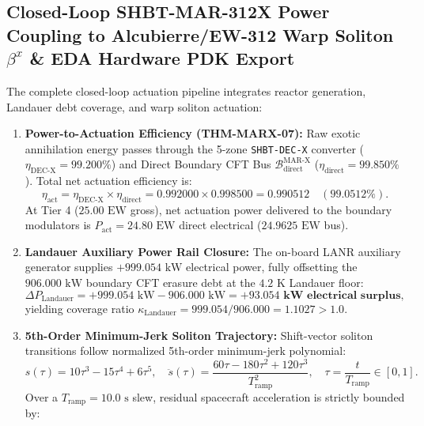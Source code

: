 \documentclass[11pt,onecolumn]{article}
\begin{document}
\subsection{Closed-Loop SHBT-MAR-312X Power Coupling to Alcubierre/EW-312 Warp Soliton \texorpdfstring{$\beta^x$}{beta\textasciicircum x} \& EDA Hardware PDK Export}
\label{subsec:warp_soliton_coupling}
The complete closed-loop actuation pipeline integrates reactor generation, Landauer debt coverage, and warp soliton actuation:
\begin{enumerate}
    \item \textbf{Power-to-Actuation Efficiency (THM-MARX-07):} Raw exotic annihilation energy passes through the 5-zone \texttt{SHBT-DEC-X} converter ($\eta_{\text{DEC-X}} = 99.200\%$) and Direct Boundary CFT Bus $\mathcal{B}_{\text{direct}}^{\text{MAR-X}}$ ($\eta_{\text{direct}} = 99.850\%$). Total net actuation efficiency is:
    \begin{equation}
    \eta_{\text{act}} = \eta_{\text{DEC-X}} \times \eta_{\text{direct}} = 0.992000 \times 0.998500 = \mathbf{0.990512} \quad (\mathbf{99.0512\%}).
    \end{equation}
    At Tier 4 ($25.00\text{ EW}$ gross), net actuation power delivered to the boundary modulators is $P_{\text{act}} = 24.80\text{ EW}$ direct electrical ($24.9625\text{ EW}$ bus).
    \item \textbf{Landauer Auxiliary Power Rail Closure:} The on-board LANR auxiliary generator supplies $+999.054\text{ kW}$ electrical power, fully offsetting the $906.000\text{ kW}$ boundary CFT erasure debt at the $4.2\text{ K}$ Landauer floor:
    \begin{equation}
    \Delta P_{\text{Landauer}} = +999.054\text{ kW} - 906.000\text{ kW} = \mathbf{+93.054\text{ kW electrical surplus}},
    \end{equation}
    yielding coverage ratio $\kappa_{\text{Landauer}} = 999.054 / 906.000 = 1.1027 > 1.0$.
    \item \textbf{5th-Order Minimum-Jerk Soliton Trajectory:} Shift-vector soliton transitions follow normalized 5th-order minimum-jerk polynomial:
    \begin{equation}
    s(\tau) = 10\tau^3 - 15\tau^4 + 6\tau^5, \quad \ddot{s}(\tau) = \frac{60\tau - 180\tau^2 + 120\tau^3}{T_{\text{ramp}}^2}, \quad \tau = \frac{t}{T_{\text{ramp}}} \in [0, 1].
    \end{equation}
    Over a $T_{\text{ramp}} = 10.0\text{ s}$ slew, residual spacecraft acceleration is strictly bounded by:
    \begin{equation}

\end{equation}
\end{enumerate}
\end{document}
